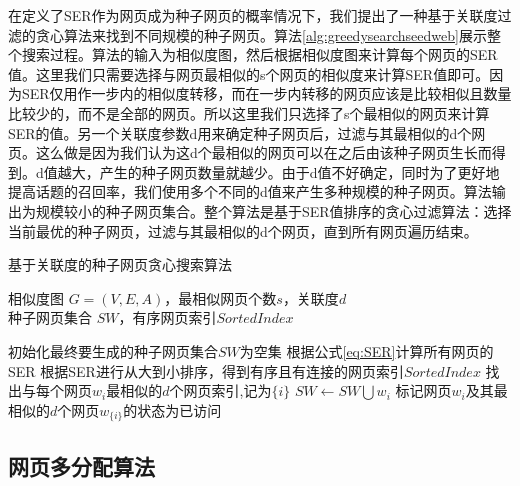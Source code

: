 在定义了SER作为网页成为种子网页的概率情况下，我们提出了一种基于关联度过滤的贪心算法来找到不同规模的种子网页。算法\ref{alg:greedysearchseedweb}展示整个搜索过程。算法的输入为相似度图，然后根据相似度图来计算每个网页的SER值。这里我们只需要选择与网页最相似的s个网页的相似度来计算SER值即可。因为SER仅用作一步内的相似度转移，而在一步内转移的网页应该是比较相似且数量比较少的，而不是全部的网页。所以这里我们只选择了s个最相似的网页来计算SER的值。另一个关联度参数d用来确定种子网页后，过滤与其最相似的d个网页。这么做是因为我们认为这d个最相似的网页可以在之后由该种子网页生长而得到。d值越大，产生的种子网页数量就越少。由于d值不好确定，同时为了更好地提高话题的召回率，我们使用多个不同的d值来产生多种规模的种子网页。算法输出为规模较小的种子网页集合。整个算法是基于SER值排序的贪心过滤算法：选择当前最优的种子网页，过滤与其最相似的d个网页，直到所有网页遍历结束。
\begin{algorithm}[!htbp]
    \caption{基于关联度的种子网页贪心搜索算法}\label{alg:greedysearchseedweb}
    \hspace*{0.02in}{\bf Input:}
    相似度图 $G=(V,E,A)$，最相似网页个数$s$，关联度$d$\\
    \hspace*{0.02in}{\bf Output:}
    种子网页集合 $SW$，有序网页索引$SortedIndex$
    \begin{algorithmic}[1]
        \State 初始化最终要生成的种子网页集合$SW$为空集
        \State 根据公式\ref{eq:SER}计算所有网页的SER
        \State 根据SER进行从大到小排序，得到有序且有连接的网页索引$SortedIndex$
        \State 找出与每个网页$w_i$最相似的$d$个网页索引,记为$\{i\}$
        \State $SW \leftarrow SW \bigcup w_i$
        \State 标记网页$w_i$及其最相似的$d$个网页$w_{\{i\}}$的状态为已访问
        \EndIf
        \EndFor
    \end{algorithmic}
\end{algorithm}


\subsection{网页多分配算法}

